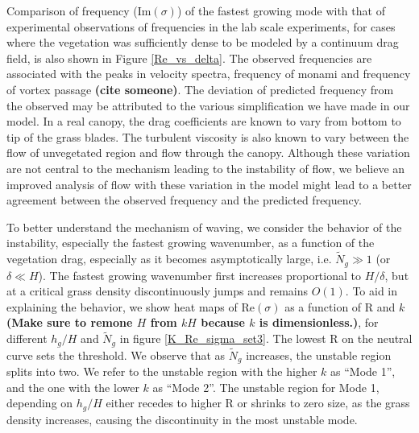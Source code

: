 \documentclass[aps,prl,reprint,twocolumn,showpacs,superscriptaddress,10pt]{revtex4-1}  %
\newcommand{\hg}{h_g}
\newcommand{\Rey}{\text{R}}
\newcommand{\Ndg}{\tilde{N}_g}
\newcommand{\shreyas}[1]{{\bf (#1)}}
\begin{document}
Comparison of frequency (Im$(\sigma)$) of the fastest growing mode with that of experimental observations of frequencies in the lab scale experiments, for cases where the vegetation was sufficiently dense to be modeled by a continuum drag field, is also shown in Figure \ref{Re_vs_delta}. The observed frequencies are associated with the peaks in velocity spectra, frequency of monami and frequency of vortex passage \shreyas{cite someone}. The deviation of predicted frequency from the observed may be attributed to the various simplification we have made in our model. In a real canopy, the drag coefficients are known to
vary from bottom to tip of the grass blades\cite{Vivoni98,Nepf00}. The turbulent viscosity is also known to vary between the flow of unvegetated region and flow through the canopy. Although these variation
are not central to the mechanism leading to the instability of flow, we believe an improved analysis of flow with these variation in the model might lead to a better agreement between the
observed frequency and the predicted frequency.

To better understand the mechanism of waving, we consider the behavior of the instability, especially the fastest growing wavenumber, as a function of the vegetation drag, especially as it becomes asymptotically large, i.e. $\Ndg \gg 1$ (or $\delta \ll H$).
The fastest growing wavenumber first increases proportional to $H/\delta$, but at a critical grass density discontinuously jumps and remains $O(1)$. 
To aid in explaining the behavior, we show heat maps of Re$(\sigma)$ as a function of $\Rey$ and $k$ \shreyas{Make sure to remone $H$ from $kH$ because $k$ is dimensionless.}, for different $\hg/H$ and $\Ndg$ in figure \ref{K_Re_sigma_set3}. 
The lowest $\Rey$ on the neutral curve sets the threshold. 
We observe that as $\Ndg$ increases, the unstable region splits into two. We refer to the unstable region with the higher $k$ as ``Mode 1'', and the one with the lower $k$ as ``Mode 2''. 
The unstable region for Mode 1, depending on $\hg/H$ either recedes to higher $\Rey$ or shrinks to zero size, as the grass density increases, causing the discontinuity in the most unstable mode.
\end{document}
